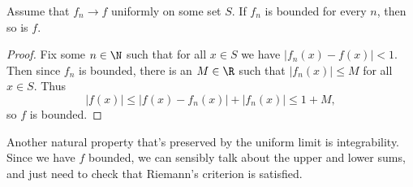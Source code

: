 \begin{lemma}\label{lemma:uniform-bounded}
Assume that $f_n \rightarrow f$ uniformly on some set $S$.  
If $f_n$ is bounded for every $n$, then so is $f$.  
\end{lemma}
\begin{proof}
Fix some $n \in \N$ such that for all $x \in S$ we have $|f_n(x) - f(x)| < 1$. Then since $f_n$ is bounded, there is an $M \in \R$ such that $|f_n(x)| \leq M$ for all $x \in S$. Thus
$$
    |f(x)| \leq |f(x) - f_n(x)| + |f_n(x)| \leq 1 + M,
$$
so $f$ is bounded.
\end{proof}

Another natural property that's preserved by the uniform limit is integrability. Since we have $f$ bounded, we can sensibly talk about the upper and lower sums, and just need to check that Riemann's criterion is satisfied.



